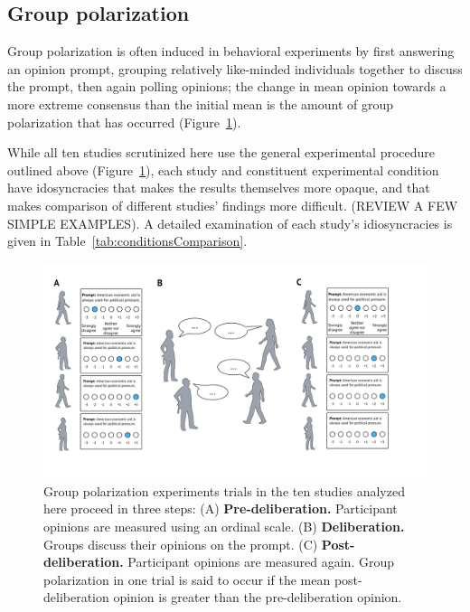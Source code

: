 \documentclass[11pt, letterpaper]{article}
\begin{document}
\subsection{Group polarization}

Group polarization is often induced in behavioral experiments by first answering
an opinion prompt, grouping
relatively like-minded individuals together to discuss the prompt, then 
again polling opinions; the change in mean opinion towards a more extreme
consensus than the initial mean is the amount of group polarization that has occurred
(Figure~\ref{fig:groupPolarizationSchematic}). 

While all ten studies scrutinized here use the general experimental procedure
outlined above (Figure~\ref{fig:groupPolarizationSchematic}), each study and constituent 
experimental condition have idosyncracies that makes the results themselves
more opaque, and that makes comparison of different studies' findings more
difficult. (REVIEW A FEW SIMPLE EXAMPLES). A detailed examination of each study's
idiosyncracies is given in Table~\ref{tab:conditionsComparison}.

\begin{figure}
  \caption{Group polarization experiments trials in the ten studies
    analyzed here proceed in three steps: 
    (A) \textbf{Pre-deliberation.} Participant opinions are measured using an 
    ordinal scale. 
    (B) \textbf{Deliberation.} Groups discuss their opinions on the prompt. 
    (C) \textbf{Post-deliberation.} Participant opinions are measured again.
    Group polarization in one trial is said to occur if 
    the mean post-deliberation opinion is greater than the pre-deliberation 
    opinion.
}
  \label{fig:groupPolarizationSchematic}
  \centering
  \includegraphics[width=\textwidth]{Figures/GPExperimentSketch.pdf}
\end{figure}
\end{document}
